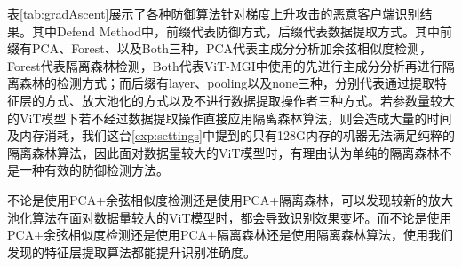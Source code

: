 \documentclass[conference]{IEEEtran}
\begin{document}
\begin{table}[htbp]
    \caption{Grad Ascent Defense Result}
    \vspace{-10pt}  %
    \begin{center}
    \label{tab:gradAscent}
    \end{center}
\end{table}

表\hyperref[tab:gradAscent]{\ref{tab:gradAscent}}展示了各种防御算法针对梯度上升攻击的恶意客户端识别结果。其中Defend Method中，前缀代表防御方式，后缀代表数据提取方式。其中前缀有PCA、Forest、以及Both三种，PCA代表主成分分析加余弦相似度检测，Forest代表隔离森林检测，Both代表ViT-MGI中使用的先进行主成分分析再进行隔离森林的检测方式；而后缀有layer、pooling以及none三种，分别代表通过提取特征层的方式、放大池化的方式以及不进行数据提取操作者三种方式。若参数量较大的ViT模型下若不经过数据提取操作直接应用隔离森林算法，则会造成大量的时间及内存消耗，我们这台\hyperref[exp:settings]{\ref{exp:settings}}中提到的只有128G内存的机器无法满足纯粹的隔离森林算法，因此面对数据量较大的ViT模型时，有理由认为单纯的隔离森林不是一种有效的防御检测方法。

不论是使用PCA+余弦相似度检测还是使用PCA+隔离森林，可以发现较新的放大池化\cite{betterTogether}算法在面对数据量较大的ViT模型时，都会导致识别效果变坏。而不论是使用PCA+余弦相似度检测还是使用PCA+隔离森林还是使用隔离森林算法，使用我们发现的特征层提取算法都能提升识别准确度。
\end{document}

